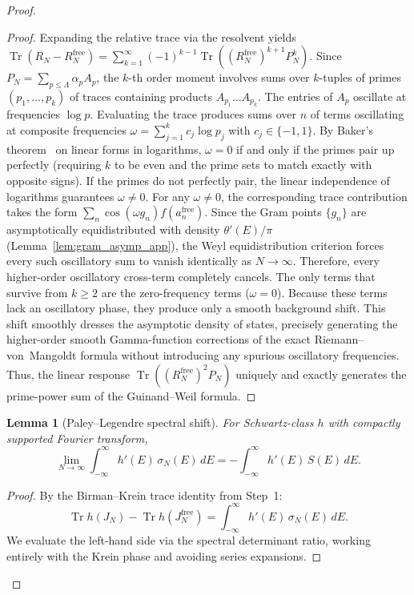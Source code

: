 \documentclass{pre-aomart}
\theoremstyle{plain}
\newtheorem{lemma}[theorem]{Lemma}
\theoremstyle{definition}
\theoremstyle{remark}
\begin{document}
\begin{proof}
\begin{proof}
Expanding the relative trace via the resolvent yields
$\operatorname{Tr}(R_N - R_N^{\mathrm{free}}) = \sum_{k=1}^\infty (-1)^{k-1} \operatorname{Tr}( (R_N^{\mathrm{free}})^{k+1} P_N^k )$.
Since $P_N = \sum_{p \le \Lambda} \alpha_p A_p$, the $k$-th order moment involves sums over $k$-tuples of primes $(p_1, \dots, p_k)$ of traces containing products $A_{p_1} \dots A_{p_k}$.
The entries of $A_p$ oscillate at frequencies $\log p$. Evaluating the trace produces sums over $n$ of terms oscillating at composite frequencies $\omega = \sum_{j=1}^k c_j \log p_j$ with $c_j \in \{-1, 1\}$.
By Baker's theorem~\cite{Baker1975} on linear forms in logarithms, $\omega = 0$ if and only if the primes pair up perfectly (requiring $k$ to be even and the prime sets to match exactly with opposite signs). If the primes do not perfectly pair, the linear independence of logarithms guarantees $\omega \ne 0$.
For any $\omega \ne 0$, the corresponding trace contribution takes the form $\sum_n \cos(\omega g_n) f(a_n^{\mathrm{free}})$. Since the Gram points $\{g_n\}$ are asymptotically equidistributed with density $\theta'(E)/\pi$ (Lemma~\ref{lem:gram_asymp_app}), the Weyl equidistribution criterion forces every such oscillatory sum to vanish identically as $N \to \infty$.
Therefore, every higher-order oscillatory cross-term completely cancels. The only terms that survive from $k \ge 2$ are the zero-frequency terms ($\omega = 0$). Because these terms lack an oscillatory phase, they produce only a smooth background shift. This shift smoothly dresses the asymptotic density of states, precisely generating the higher-order smooth Gamma-function corrections of the exact Riemann--von~Mangoldt formula without introducing any spurious oscillatory frequencies.
Thus, the linear response $\operatorname{Tr}( (R_N^{\mathrm{free}})^{2} P_N )$ uniquely and exactly generates the prime-power sum of the Guinand--Weil formula.
\end{proof}

\begin{lemma}[Paley--Legendre spectral shift]\label{lem:PN_shift}
For Schwartz-class $h$ with compactly supported Fourier transform,
\[
\lim_{N\to\infty}\int_{-\infty}^{\infty} h'(E)\,\sigma_N(E)\,dE
= -\int_{-\infty}^{\infty} h'(E)\,S(E)\,dE.
\]
\end{lemma}

\begin{proof}
By the Birman--Krein trace identity from Step~1:
\begin{equation}\label{eq:bk_trace}
\operatorname{Tr} h(J_N) - \operatorname{Tr} h(J_N^{\mathrm{free}})
= \int_{-\infty}^{\infty} h'(E)\,\sigma_N(E)\,dE.
\end{equation}
We evaluate the left-hand side via the spectral determinant ratio,
working entirely with the Krein phase and avoiding series expansions.


\end{proof}
\end{proof}
\end{document}
